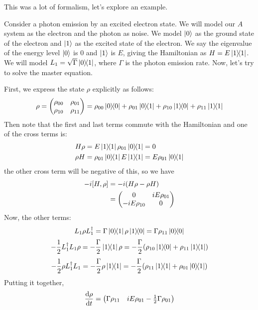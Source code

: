 This was a lot of formalism, let's explore an example.
\begin{example}
    Consider a photon emission by an excited electron state. We will
    model our $A$ system as the electron and the photon as noise. We model $\ket{0}$ as the ground state of the electron
    and $\ket{1}$ as the excited state of the electron. We say the eigenvalue of the energy level $\ket{0}$ is $0$ and $\ket{1}$ is $E$,
    giving the Hamiltonian as $H = E \ketbra{1}$. We will model $L_1 = \sqrt{\Gamma} \ketbra{0}{1}$, where $\Gamma$ is the photon emission rate.
    Now, let's try to solve the master equation. 
    
    First, we express the state $\rho$ explicitly as follows:
    \[ \rho = \begin{pmatrix}
        \rho_{00} & \rho_{01} \\ \rho_{10} & \rho_{11}
    \end{pmatrix} = \rho_{00} \ketbra{0} + \rho_{01} \ketbra{0}{1} + \rho_{10} \ketbra{1}{0} + \rho_{11} \ketbra{1}{1} \]
    Then note that the first and last terms commute with the Hamiltonian and one of the cross terms is:
    \begin{align*}
        H \rho &= E \ketbra{1}{1} \rho_{01} \ketbra{0}{1} = 0 \\
        \rho H &= \rho_{01} \ketbra{0}{1} E \ketbra{1}{1} = E \rho_{01} \ketbra{0}{1}
    \end{align*}
    the other cross term will be negative of this, so we have
    \begin{align*}
        -i [H, \rho] &= -i \qty(H \rho - \rho H) \\
        &= \begin{pmatrix}
            0 & iE \rho_{01} \\
            -iE\rho_{10} & 0
        \end{pmatrix}
    \end{align*}
    Now, the other terms:
    \[ L_1 \rho L_1^{\dagger} = \Gamma \ketbra{0}{1} \rho \ketbra{1}{0} = \Gamma \rho_{11} \ketbra{0}{0} \]
    \[ -\frac{1}{2} L_1^{\dagger} L_1 \rho = -\frac{\Gamma}{2} \ketbra{1}{1} \rho = -\frac{\Gamma}{2} \qty(\rho_{10} \ketbra{1}{0} + \rho_{11} \ketbra{1}{1}) \]
    \[ -\frac{1}{2} \rho L_1^{\dagger} L_1 = -\frac{\Gamma}{2} \rho \ketbra{1}{1} = -\frac{\Gamma}{2} \qty(\rho_{11} \ketbra{1} + \rho_{01} \ketbra{0}{1})\]
    Putting it together,
    \[ \dv{\rho}{t} = \begin{pmatrix}
        \Gamma \rho_{11} & iE\rho_{01} - \frac{1}{2} \Gamma \rho_{01} \\

\end{pmatrix}\]
\end{example}
